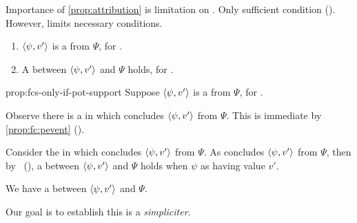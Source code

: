 \begin{note}
  Importance of \autoref{prop:attribution} is limitation on \ros{}.
  Only sufficient condition (\supportI{}).
  However, \supportII{} limits necessary conditions.
\end{note}


\begin{note}
  \begin{proposition}
    \label{prop:fcs-only-if-pot-support}

    \begin{enumerate}
    \item[\emph{If}:]
      \(\langle \psi, v' \rangle\) is a  from \(\Psi\), for \vAgent{}.
    \item[\emph{Then}:]
      A  between \(\langle \psi, v' \rangle\) and \(\Psi\) holds, for \vAgent{}.
    \end{enumerate}
    \vspace{-\baselineskip}
  \end{proposition}

  \begin{argument}{prop:fcs-only-if-pot-support}
    Suppose \(\langle \psi, v' \rangle\) is a  from \(\Psi\), for \vAgent{}.

    \smallskip
    Observe there is a \pevent{} in which \vAgent{} concludes \(\langle \psi, v' \rangle\) from \(\Psi\).
    This is immediate by \autoref{prop:fc:pevent} ().

    \smallskip
    Consider the \pevent{} in which \vAgent{} concludes \(\langle \psi, v' \rangle\) from \(\Psi\).
    As \vAgent{} concludes \(\langle \psi, v' \rangle\) from \(\Psi\), then by~\supportI{} (\supportIpage{}), a \ros{} between \(\langle \psi, v' \rangle\) and \(\Psi\) holds when \vAgent{}  \(\psi\) as having value \(v'\).

    We have a \potential{} \ros{} between \(\langle \psi, v' \rangle\) and \(\Psi\).

    Our goal is to establish this \potential{} \ros{} is a \ros{} \emph{simpliciter}.


\end{argument}
\end{note}
